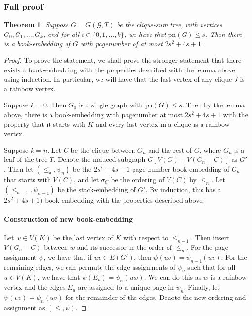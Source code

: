\documentclass[]{article}
\newcommand{\pn}{\text{pn}}
\newtheorem{theorem}{Theorem}
\theoremstyle{definition}
\numberwithin{theorem}{section}
\numberwithin{equation}{section}
\begin{document}
\subsubsection{Full proof}
\begin{theorem}
	Suppose $G = G(\mathcal{G}, T)$ be the clique-sum tree, with vertices $G_0, G_1, ..., G_k$, and for all $i \in \lbrace 0, 1, ..., k \rbrace$, we have that $\pn(G) \leq s$. Then there is a book-embedding of $G$ with pagenumber of at most $2s^2 + 4s + 1$. 
\end{theorem}

\begin{proof}
	To prove the statement, we shall prove the stronger statement that there exists a book-embedding with the properties described with the lemma above using induction. In particular, we will have that the last vertex of any clique $J$ is a rainbow vertex.
	
	Suppose $k = 0$. Then $G_0$ is a single graph with $\pn(G) \leq s$. Then by the lemma above, there is a book-embedding with pagenumber at most $2s^2 + 4s + 1$ with the property that it starts with $K$ and every last vertex in a clique is a rainbow vertex.
	
	Suppose $k = n$. Let $C$ be the clique between $G_n$ and the rest of $G$, where $G_n$ is a leaf of the tree $T$. Denote the induced subgraph $G[V(G) - V(G_n - C)]$ as $G'$. Then let $(\leq_n, \psi_n)$ be the $2s^2 + 4s + 1$-page-number book-embedding of $G_n$ that starts with $V(C)$, and let $\sigma_C$ be the ordering of $V(C)$ by $\leq_n$. Let $(\leq_{n-1}, \psi_{n-1})$ be the stack-embedding of $G'$. By induction, this has a $2s^2 + 4s + 1)$ book-embedding with the properties described above.
	
	\paragraph{Construction  of new book-embedding}
	Let $w \in V(K)$ be the last vertex of $K$ with respect to $\leq_{n-1}$. Then insert $V(G_n - C)$ between $w$ and its successor in the order of $\leq_{n}$. For the page assignment $\psi$, we have that if $uv \in E(G')$, then $\psi(uv) = \psi_{n-1}(uv)$. For the remaining edges, we can permute the edge assignments of $\psi_n$ such that for all $u \in V(K)$, we have that $\psi(E_u) = \psi_n(uw)$. We can do this as $w$ is a rainbow vertex and the edges $E_u$ are assigned to a unique page in $\psi_n$. Finally, let $\psi(uv) = \psi_n(uv)$ for the remainder of the edges. Denote the new ordering and assignment as $(\leq, \psi)$. 
	

\end{proof}
\end{document}
